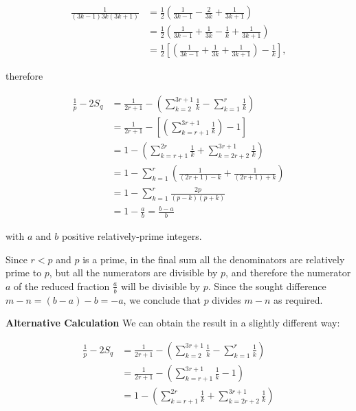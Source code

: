 \begin{enumerate}
 
 \begin{align*} \frac{1}{(3k-1)3k(3k+1)} &= \frac{1}{2}\left(\frac{1}{3k-1} - \frac{2}{3k} + \frac{1}{3k+1}\right) \\ &= \frac{1}{2}\left(\frac{1}{3k-1} + \frac{1}{3k} - \frac{1}{k} + \frac{1}{3k+1}\right) \\ &= \frac{1}{2}\left[\left(\frac{1}{3k-1} + \frac{1}{3k} + \frac{1}{3k+1}\right) - \frac{1}{k}\right], \end{align*}


 

 therefore

 
 \begin{align*} \frac{1}{p} - 2S_q &= \frac{1}{2r+1} - \left(\sum_{k=2}^{3r+1}\frac{1}{k} - \sum_{k=1}^{r} \frac{1}{k}\right) \\ &= \frac{1}{2r+1} - \left[\left(\sum_{k=r+1}^{3r+1}\frac{1}{k}\right)- 1\right] \\ &= 1 - \left(\sum_{k=r+1}^{2r}\frac{1}{k} + \sum_{k=2r+2}^{3r+1}\frac{1}{k}\right) \\ &= 1 - \sum_{k=1}^{r}\left(\frac{1}{(2r+1) - k} + \frac{1}{(2r+1) + k}\right) \\ &= 1 - \sum_{k=1}^{r}\frac{2p}{(p - k)(p + k)} \\ &= 1 - \frac{a}{b} = \frac{b - a}{b} \end{align*}


 

 with $a$ and $b$ positive relatively-prime integers.

 Since $r < p$ and $p$ is a prime, in the final sum all the denominators are relatively prime to $p$, but all the numerators are divisible by $p$, and therefore the numerator $a$ of the reduced fraction $\frac{a}{b}$ will be divisible by $p$. Since the sought difference $m - n = (b-a) - b = -a$, we conclude that $p$ divides $m-n$ as required.

 \textbf{Alternative Calculation} We can obtain the result in a slightly different way:

 
 \begin{align*} \frac{1}{p} - 2S_q &= \frac{1}{2r+1} - \left(\sum_{k=2}^{3r+1}\frac{1}{k} - \sum_{k=1}^{r} \frac{1}{k}\right) \\ &= \frac{1}{2r+1} - \left(\sum_{k=r+1}^{3r+1}\frac{1}{k} - 1\right) \\ &= 1 - \left(\sum_{k=r+1}^{2r}\frac{1}{k} + \sum_{k=2r+2}^{3r+1}\frac{1}{k}\right) \end{align*}



\end{enumerate}
